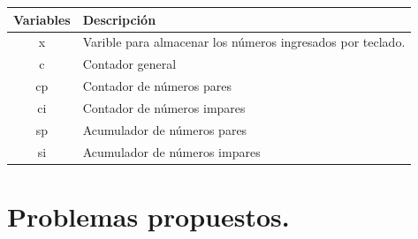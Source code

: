 \documentclass[a4paper,12pt,spanish]{article}
\begin{document}
\begin{minipage}[H]{0.4\linewidth}
  \begin{table}[H]
    \centering
    \begin{tabular}[H]{|c|m{5 cm}|}
      \hline
      \rowcolor{lightgray!30}
      
      Variables & Descripción \\
      \hline \hline
      x & Varible para almacenar los números ingresados por teclado. \\ \hline 
      c & Contador general  \\ \hline
      cp & Contador de números pares  \\ \hline
      ci & Contador de números impares  \\ \hline
      sp & Acumulador de números pares  \\ \hline
      si & Acumulador de números impares  \\ \hline
      
    \end{tabular}
  \end{table}
\end{minipage}

\newpage
\section{Problemas propuestos. }
\end{document}
